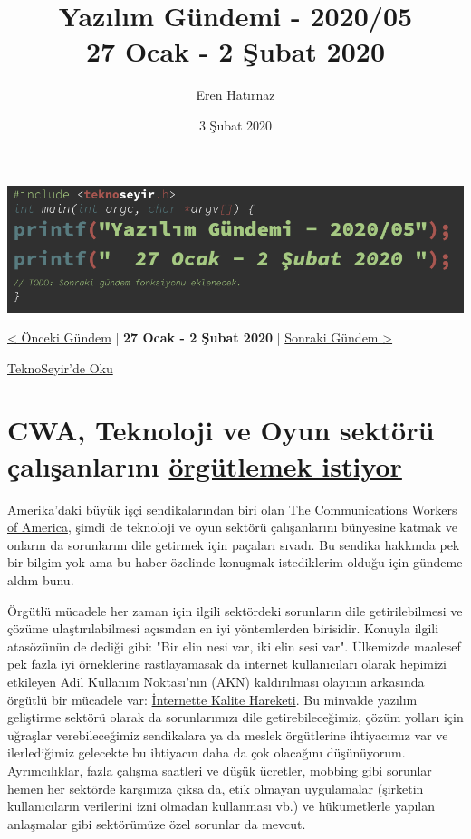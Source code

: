 \documentclass[11pt]{article}
\author{Eren Hatırnaz}
\date{3 Şubat 2020}
\title{Yazılım Gündemi - 2020/05\\\medskip
\large 27 Ocak - 2 Şubat 2020}
\begin{document}
\maketitle
\tableofcontents \clearpage\shorthandoff{=}

\begin{center}
\includegraphics[width=.9\linewidth]{gorseller/yazilim-gundemi-banner.png}
\end{center}

\begin{center}
\href{../04/yazilim-gundemi-2020-04.pdf}{< Önceki Gündem} | \textbf{27 Ocak - 2 Şubat 2020} | \href{../06/yazilim-gundemi-2020-06.pdf}{Sonraki Gündem >}

\href{https://teknoseyir.com/blog/yazilim-gundemi-2020-05}{TeknoSeyir'de Oku}
\end{center}

\section{CWA, Teknoloji ve Oyun sektörü çalışanlarını \href{https://gizmodo.com/cwa-launches-new-effort-to-unionize-game-and-tech-worke-1840861878}{örgütlemek istiyor}}
\label{sec:org3470f54}
Amerika'daki büyük işçi sendikalarından biri olan \href{https://en.wikipedia.org/wiki/Communications\_Workers\_of\_America}{The Communications Workers
of America}, şimdi de teknoloji ve oyun sektörü çalışanlarını bünyesine katmak
ve onların da sorunlarını dile getirmek için paçaları sıvadı. Bu sendika
hakkında pek bir bilgim yok ama bu haber özelinde konuşmak istediklerim olduğu
için gündeme aldım bunu.

Örgütlü mücadele her zaman için ilgili sektördeki sorunların dile
getirilebilmesi ve çözüme ulaştırılabilmesi açısından en iyi yöntemlerden
birisidir. Konuyla ilgili atasözünün de dediği gibi: "Bir elin nesi var, iki
elin sesi var". Ülkemizde maalesef pek fazla iyi örneklerine rastlayamasak da
internet kullanıcıları olarak hepimizi etkileyen Adil Kullanım Noktası'nın
(AKN) kaldırılması olayının arkasında örgütlü bir mücadele var: \href{https://internettekalite.com/}{İnternette
Kalite Hareketi}. Bu minvalde yazılım geliştirme sektörü olarak da
sorunlarımızı dile getirebileceğimiz, çözüm yolları için uğraşlar
verebileceğimiz sendikalara ya da meslek örgütlerine ihtiyacımız var ve
ilerlediğimiz gelecekte bu ihtiyacın daha da çok olacağını düşünüyorum.
Ayrımcılıklar, fazla çalışma saatleri ve düşük ücretler, mobbing gibi sorunlar
hemen her sektörde karşımıza çıksa da, etik olmayan uygulamalar (şirketin
kullanıcıların verilerini izni olmadan kullanması vb.) ve hükumetlerle yapılan
anlaşmalar gibi sektörümüze özel sorunlar da mevcut.
\end{document}
